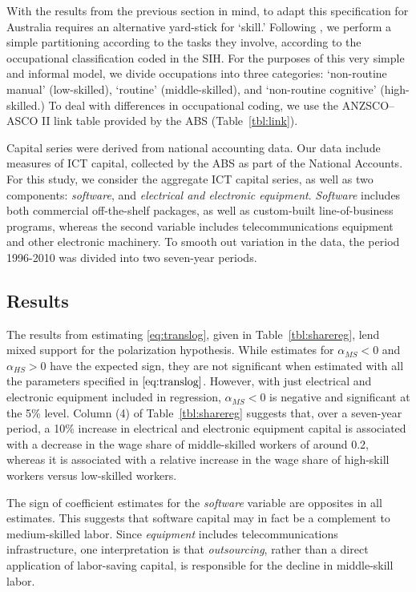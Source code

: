 With the results from the previous section in mind, to adapt this specification for Australia requires an alternative yard-stick for `skill.' Following \citet{Levy2003}, we perform a simple partitioning according to the tasks they involve, according to the occupational classification coded in the SIH. For the purposes of this very simple and informal model, we divide occupations into three categories: `non-routine manual' (low-skilled), `routine' (middle-skilled), and `non-routine cognitive' (high-skilled.) To deal with differences in occupational coding, we use the ANZSCO--ASCO II link table provided by the ABS (Table~\ref{tbl:link}).

Capital series were derived from national accounting data. Our data include measures of ICT capital, collected by the ABS as part of the National Accounts. For this study, we consider the aggregate ICT capital series, as well as two components: {\em software}, and {\em electrical and electronic equipment}. {\em Software} includes both commercial off-the-shelf packages, as well as custom-built line-of-business programs, whereas the second variable includes telecommunications equipment and other electronic machinery. To smooth out variation in the data, the  period 1996-2010 was divided into two seven-year periods.

\subsection{Results}

The results from estimating \eqref{eq:translog}, given in Table~\ref{tbl:sharereg}, lend mixed support for the polarization hypothesis. While estimates for $\alpha_{MS}<0$ and $\alpha_{HS}>0$ have the expected sign, they are not significant when estimated with all the parameters specified in $\eqref{eq:translog}$. However, with just electrical and electronic equipment included in regression, $\alpha_{MS}<0$ is negative and significant at the 5\% level. Column (4) of Table~\ref{tbl:sharereg} suggests that, over a seven-year period, a 10\% increase in electrical and electronic equipment capital is associated with a decrease in the wage share of middle-skilled workers of around 0.2, whereas it is associated with a relative increase in the wage share of high-skill workers versus low-skilled workers.

The sign of coefficient estimates for the {\em software} variable are opposites in all estimates. This suggests that software capital may in fact be a complement to medium-skilled labor. Since {\em equipment} includes telecommunications infrastructure, one interpretation is that {\em outsourcing}, rather than a direct application of labor-saving capital, is responsible for the decline in middle-skill labor.

